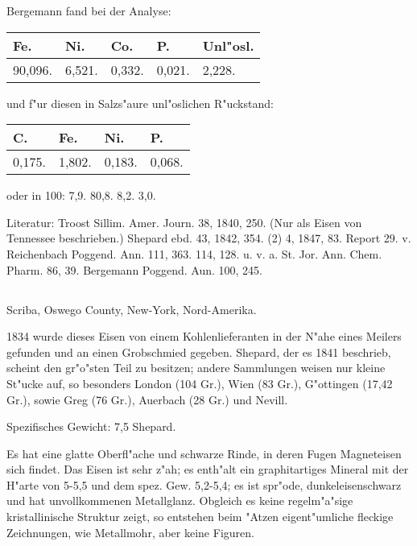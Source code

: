 \documentclass[a4paper, 11pt, oneside]{article}
\begin{document}
Bergemann fand bei der Analyse:
\begin{table}[H]
    \centering\swabfamily\Large
    \begin{tabular}{l l l l l}
        Fe. & Ni. & Co. & P. & Unl"osl. \\ \hline
        90,096. & 6,521. & 0,332. & 0,021. & 2,228. \\
    \end{tabular}
\end{table}

und f"ur diesen in Salzs"aure unl"oslichen R"uckstand:
\begin{table}[H]
    \centering\swabfamily\Large
    \begin{tabular}{ l l l l}
        C. & Fe. & Ni. & P. \\ \hline
        0,175. & 1,802. & 0,183. & 0,068. \\
    \end{tabular}
\end{table}

oder in 100: 7,9. 80,8. 8,2. 3,0.

\normalsize
Literatur: Troost Sillim. Amer. Journ. 38, 1840, 250. (Nur als Eisen von Tennessee beschrieben.) Shepard ebd. 43, 1842, 354. (2) 4, 1847, 83. Report 29. v. Reichenbach Poggend. Ann. 111, 363. 114, 128. u. v. a. St. Jor. Ann. Chem. Pharm. 86, 39. Bergemann Poggend. Aun. 100, 245.

\subsection{}
\LARGE
\paragraph{}
Scriba, Oswego County, New-York, Nord-Amerika.

1834 wurde dieses Eisen von einem Kohlenlieferanten in der N"ahe eines Meilers gefunden und an einen Grobschmied gegeben. Shepard, der es 1841 beschrieb, scheint den gr"o"sten Teil zu besitzen; andere Sammlungen weisen nur kleine St"ucke auf, so besonders London (104 Gr.), Wien (83 Gr.), G"ottingen (17,42 Gr.), sowie Greg (76 Gr.), Auerbach (28 Gr.) und Nevill.

Spezifisches Gewicht: 7,5 Shepard.

Es hat eine glatte Oberfl"ache und schwarze Rinde, in deren Fugen Magneteisen sich findet. Das Eisen ist sehr z"ah; es enth"alt ein graphitartiges Mineral mit der H"arte von 5-5,5 und dem spez. Gew. 5,2-5,4; es ist spr"ode, dunkeleisenschwarz und hat unvollkommenen Metallglanz. Obgleich es keine regelm"a"sige kristallinische Struktur zeigt, so entstehen beim "Atzen eigent"umliche fleckige Zeichnungen, wie Metallmohr, aber keine Figuren.
\end{document}
